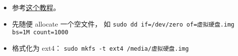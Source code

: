 
\begin{issues}
\issueDraft
\end{issues}

\begin{itemize}
\item 参考\href{https://www.tecmint.com/create-virtual-harddisk-volume-in-linux/}{这个教程}。
\item 先随便 allocate 一个空文件， 如 \verb|sudo dd if=/dev/zero of=虚拟硬盘.img bs=1M count=1000|
\item 格式化为 ext4： \verb|sudo mkfs -t ext4 /media/虚拟硬盘.img|
\end{itemize}
